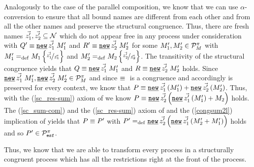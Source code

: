 \begin{prf}
\begin{description}
\begin{description}
Analogously to the case of the parallel composition, we know that we can use $\alpha$-conversion to ensure that all bound names are different from each other and from all the other names and preserve the structural congruence. Thus, there are fresh names $\vec{z_1'},\vec{z_2'}\subseteq\mathcal N$ which do not appear free in any process under consideration with $Q'\struc{}\procres{\vec{z_1'}}{M_1'}$ and $R'\struc{}\procres{\vec{z_2'}}{M_2'}$ for some $M_1',M_2'\in\mathcal P^{\pi}_{M}$ with $M_1'=_{\mathrm{def}}{}M_1\left\{\nicefrac{\vec{z_1'}}{\vec{z_1}}\right\}$ and $M_2'=_{\mathrm{def}}{}M_2\left\{\nicefrac{\vec{z_2'}}{\vec{z_2}}\right\}$. The transitivity of the structural congruence yields that $\struct{Q}{\procres{\vec{z_1'}}{M_1'}}$ and $\struct{R}{\procres{\vec{z_2'}}{M_2'}}$ holds. Since $\procres{\vec{z_1'}}{M_1'},\procres{\vec{z_2'}}{M_2'}\in\sums$ and since $\equiv{}$ is a congruence and accordingly is preserved for every context, we know that $P\struct{}\procchoice{\procres[()]{\vec{z_1'}}{M_1'}}{\procres[()]{\vec{z_2'}}{M_2'}}$. Thus, with the (\ref{sc_res-sum}) axiom of  we know $\struct{P}{\procres[()]{\vec{z_2'}}{\procchoice{\procres[()]{\vec{z_1'}}{M_1'}}{M_2}}}$ holds. The (\ref{sc_sum-com}) and the (\ref{sc_res-sum}) axiom of  and the (\ref{congsum2l}) implication of  yields that $P\equiv{}{}P'$ with $P'\define{}\procres[()]{\vec{z_2'}}{\procres[()]{\vec{z_1'}}{\procchoice{M_2'}{M_1'}}}$ holds and so $P'\in\mathcal P^{\pi}_{\mathtt{esf}}$.
	\end{description}
\end{description}
\end{prf}

Thus, we know that we are able to transform every process in a structurally congruent process which has all the restrictions right at the front of the process.
